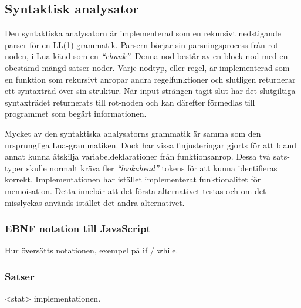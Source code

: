 \subsection{Syntaktisk analysator}

Den syntaktiska analysatorn är implementerad som en rekursivt nedstigande
parser för en LL(1)-grammatik. Parsern börjar sin parsningsprocess från
rot-noden, i Lua känd som en \textit{``chunk''}.  Denna nod består av en
block-nod med en obestämd mängd satser-noder. Varje nodtyp, eller regel, är
implementerad som en funktion som rekursivt anropar andra regelfunktioner och
slutligen returnerar ett syntaxträd över sin struktur. När input strängen
tagit slut har det slutgiltiga syntaxträdet returnerats till rot-noden och kan
därefter förmedlas till programmet som begärt informationen.

Mycket av den syntaktiska analysatorns grammatik är samma som den ursprungliga
Lua-grammatiken. Dock har vissa finjusteringar gjorts för att bland annat
kunna åtskilja variabeldeklarationer från funktionsanrop. Dessa två sats-typer
skulle normalt kräva fler \textit{``lookahead''} tokens för att kunna
identifieras korrekt. Implementationen har istället implementerat
funktionalitet för memoisation. Detta innebär att det första alternativet
testas och om det misslyckas används istället det andra alternativet.


\subsubsection{EBNF notation till JavaScript}

Hur översätts notationen, exempel på if / while.

\subsubsection{Satser}

<stat> implementationen.

%
%

